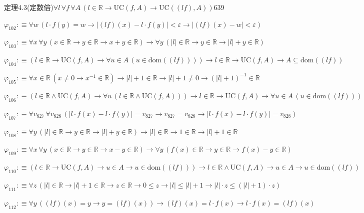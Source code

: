 \begin{fullproof}{定理4.3(定数倍)}{$\forall l\,\forall f\,\forall A\,(l \in \mathbb{R} \to \mathrm{UC}(f,A) \to \mathrm{UC}((l f),A))$}{639}
\begin{abbrevlist}
\item $\varphi_{102} :\equiv \forall w\,(l \cdot f(y) = w \to \lvert (l f)(x) - l \cdot f(y) \rvert < \varepsilon \to \lvert (l f)(x) - w \rvert < \varepsilon)$
\item $\varphi_{103} :\equiv \forall x\,\forall y\,(x \in \mathbb{R} \to y \in \mathbb{R} \to x + y \in \mathbb{R}) \to \forall y\,(\lvert l \rvert \in \mathbb{R} \to y \in \mathbb{R} \to \lvert l \rvert + y \in \mathbb{R})$
\item $\varphi_{104} :\equiv (l \in \mathbb{R} \to \mathrm{UC}(f,A) \to \forall u \in A\,(u \in \mathrm{dom}((l f)))) \to l \in \mathbb{R} \to \mathrm{UC}(f,A) \to A \subseteq \mathrm{dom}((l f))$
\item $\varphi_{105} :\equiv \forall x \in \mathbb{R}\,(x \neq 0 \to x^{-1} \in \mathbb{R}) \to \lvert l \rvert + 1 \in \mathbb{R} \to \lvert l \rvert + 1 \neq 0 \to (\lvert l \rvert + 1)^{-1} \in \mathbb{R}$
\item $\varphi_{106} :\equiv (l \in \mathbb{R} \land \mathrm{UC}(f,A) \to \forall u\,(l \in \mathbb{R} \land \mathrm{UC}(f,A))) \to l \in \mathbb{R} \to \mathrm{UC}(f,A) \to \forall u \in A\,(u \in \mathrm{dom}((l f)))$
\item $\varphi_{107} :\equiv \forall v_{827}\,\forall v_{828}\,(\lvert l \cdot f(x) - l \cdot f(y) \rvert = v_{827} \to v_{827} = v_{828} \to \lvert l \cdot f(x) - l \cdot f(y) \rvert = v_{828})$
\item $\varphi_{108} :\equiv \forall y\,(\lvert l \rvert \in \mathbb{R} \to y \in \mathbb{R} \to \lvert l \rvert + y \in \mathbb{R}) \to \lvert l \rvert \in \mathbb{R} \to 1 \in \mathbb{R} \to \lvert l \rvert + 1 \in \mathbb{R}$
\item $\varphi_{109} :\equiv \forall x\,\forall y\,(x \in \mathbb{R} \to y \in \mathbb{R} \to x - y \in \mathbb{R}) \to \forall y\,(f(x) \in \mathbb{R} \to y \in \mathbb{R} \to f(x) - y \in \mathbb{R})$
\item $\varphi_{110} :\equiv (l \in \mathbb{R} \to \mathrm{UC}(f,A) \to u \in A \to u \in \mathrm{dom}((l f))) \to l \in \mathbb{R} \land \mathrm{UC}(f,A) \to u \in A \to u \in \mathrm{dom}((l f))$
\item $\varphi_{111} :\equiv \forall z\,(\lvert l \rvert \in \mathbb{R} \to \lvert l \rvert + 1 \in \mathbb{R} \to z \in \mathbb{R} \to 0 \leq z \to \lvert l \rvert \leq \lvert l \rvert + 1 \to \lvert l \rvert \cdot z \leq (\lvert l \rvert + 1) \cdot z)$
\item $\varphi_{112} :\equiv \forall y\,((l f)(x) = y \to y = (l f)(x)) \to (l f)(x) = l \cdot f(x) \to l \cdot f(x) = (l f)(x)$

\end{abbrevlist}
\end{fullproof}
